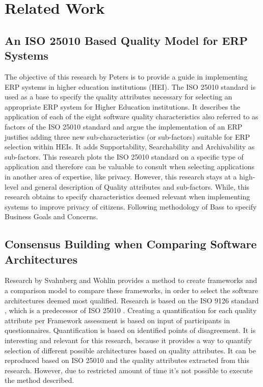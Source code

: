 \chapter{Related Work}\label{s:related}


\section*{An ISO 25010 Based Quality Model for ERP Systems}
The objective of this research by Peters \etal \cite{Peters2020AnI2} is to provide a guide in implementing ERP systems in higher education institutions (HEI). The ISO 25010 standard \cite{ISO:25010:2011} is used as a base to specify the quality attributes necessary for selecting an appropriate ERP system for Higher Education institutions. It describes the application of each of the eight software quality characteristics also referred to as factors of the ISO 25010 standard and argue the implementation of an ERP justifies adding three new sub-characteristics (or sub-factors) suitable for ERP selection within HEIs. It adds Supportability, Searchability and Archivability as sub-factors. This research plots the ISO 25010 standard on a specific type of application and therefore can be valuable to consult when selecting applications in another area of expertise, like privacy. However, this research stays at a high-level and general description of Quality attributes and sub-factors. While, this research obtains to specify characteristics deemed relevant when implementing systems to improve privacy of citizens. Following methodology of Bass \etal \cite{Bass2015SoftwareAI} to specify Business Goals and Concerns. 

\section*{Consensus Building when Comparing Software Architectures}
Research by Svahnberg and Wohlin \cite{Svahnberg2002ConsensusBW} provides a method to create frameworks and a comparison model to compare these frameworks, in order to select the software architectures deemed most qualified. Research is based on the ISO 9126 standard \cite{ISO9126}, which is a predecessor of ISO 25010 \cite{ISO:25010:2011}. Creating a quantification for each quality attribute per Framework assessment is based on input of participants in questionnaires. Quantification is based on identified points of disagreement. It is interesting and relevant for this research, because it provides a way to quantify selection of different possible architectures based on quality attributes. It can be reproduced based on ISO 25010 and the quality attributes extracted from this research. However, due to restricted amount of time it's not possible to execute the method described.

